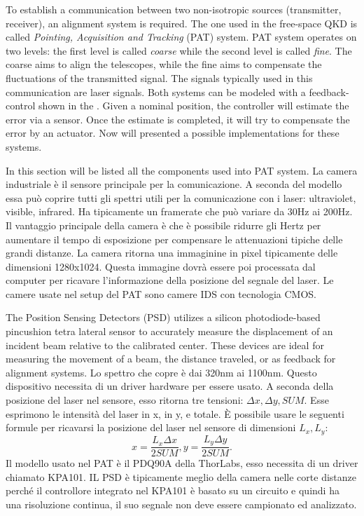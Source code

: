 To establish a communication between two non-isotropic sources (transmitter, receiver), an alignment system is required. The one used in the free-space QKD is called \textit{Pointing, Acquisition and Tracking} (PAT) system. PAT system operates on two levels: the first level is called \textit{coarse} while the second level is called \textit{fine}.
The coarse aims to align the telescopes, while the fine aims to compensate the fluctuations of the transmitted signal. The signals typically used in this communication are laser signals. Both systems can be modeled with a feedback-control shown in the .
Given a nominal position, the controller will estimate the error via a sensor. Once the estimate is completed, it will try to compensate the error by an actuator.
Now will presented a possible implementations for these systems.

In this section will be listed all the components used into PAT system.
La camera industriale è il sensore principale per la comunicazione. A seconda del modello essa può coprire tutti gli spettri utili per la comunicazione con i laser: ultraviolet, visible, infrared. Ha tipicamente un framerate che può variare da 30Hz ai 200Hz. Il vantaggio principale della camera è che è possibile ridurre gli Hertz per aumentare il tempo di esposizione per compensare le attenuazioni tipiche delle grandi distanze. La camera ritorna una immaginine in pixel tipicamente delle dimensioni 1280x1024. Questa immagine dovrà essere poi processata dal computer per ricavare l'informazione della posizione del segnale del laser. Le camere usate nel setup del PAT sono camere IDS con tecnologia CMOS.

The Position Sensing Detectors (PSD) utilizes a silicon photodiode-based pincushion tetra lateral sensor to accurately measure the displacement of an incident beam relative to the calibrated center. These devices are ideal for measuring the movement of a beam, the distance traveled, or as feedback for alignment systems. Lo spettro che copre è dai 320nm ai 1100nm. Questo dispositivo necessita di un driver hardware per essere usato. A seconda della posizione del laser nel sensore, esso ritorna tre tensioni: $\Delta x, \Delta y, SUM$. Esse esprimono le intensità del laser in x, in y, e totale. È possibile usare le seguenti formule per ricavarsi la posizione del laser nel sensore di dimensioni $L_x,L_y$:
$$x = \frac{L_x \Delta x}{2 SUM}, y = \frac{L_y \Delta y}{2 SUM}.$$
Il modello usato nel PAT è il PDQ90A della ThorLabs, esso necessita di un driver chiamato KPA101.
IL PSD è tipicamente meglio della camera nelle corte distanze perché il controllore integrato nel KPA101 è basato su un circuito e quindi ha una risoluzione continua, il suo segnale non deve essere campionato ed analizzato.

